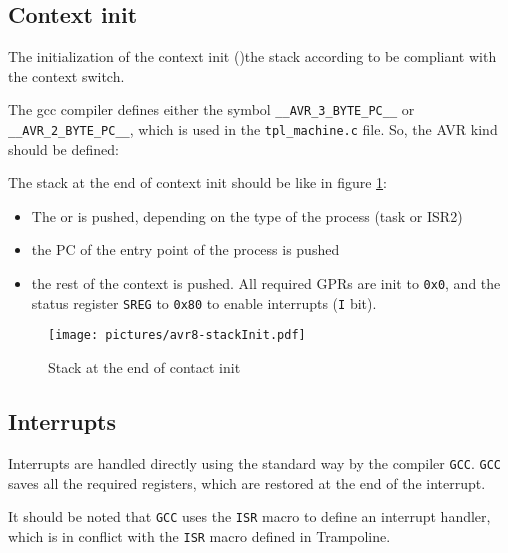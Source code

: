 \subsection{Context init}
The initialization of the context init ()the stack according to be compliant with the context switch. 


The gcc compiler defines either the symbol \texttt{\_\_AVR\_3\_BYTE\_PC\_\_} or \texttt{\_\_AVR\_2\_BYTE\_PC\_\_}, which is used in the \texttt{tpl\_machine.c} file.
So, the AVR kind should be defined:

The stack at the end of context init should be like in figure \ref{fig:avr8-stackInit}:
\begin{itemize}
\item The  or  is pushed, depending on the type of the process (task or ISR2)
\item the PC of the entry point of the process is pushed
\item the rest of the context is pushed. All required GPRs are init to \texttt{0x0}, and the status register \texttt{SREG} to \texttt{0x80} to enable interrupts (\texttt{I} bit).
\end{itemize}
\begin{figure}[htbp] %
\begin{minipage}{0.4\textwidth}
    \centering
  \texttt{[image: pictures/avr8-stackInit.pdf]} 
\end{minipage}
\begin{minipage}{0.6\textwidth}
  \caption{Stack at the end of contact init}\label{fig:avr8-stackInit}
\end{minipage}
\end{figure}

\subsection{Interrupts}
Interrupts are handled directly using the standard way by the compiler \texttt{GCC}. \texttt{GCC} saves all the required registers, which are restored at the end of the interrupt.

It should be noted that \texttt{GCC} uses the \texttt{ISR} macro to define an interrupt handler, which is in conflict with the \texttt{ISR} macro defined in Trampoline.

